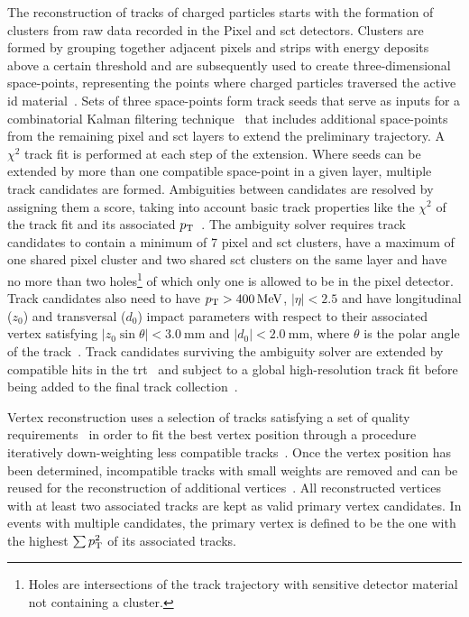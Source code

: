 The reconstruction of tracks of charged particles starts with the formation of clusters from raw data recorded in the Pixel and \gls{sct} detectors. Clusters are formed by grouping together adjacent pixels and strips with energy deposits above a certain threshold and are subsequently used to create three-dimensional space-points, representing the points where charged particles traversed the active \gls{id} material~\cite{PERF-2015-08}. Sets of three space-points form track seeds that serve as inputs for a combinatorial Kalman filtering technique~\cite{Fruhwirth:178627} that includes additional space-points from the remaining pixel and \gls{sct} layers to extend the preliminary trajectory. A $\chi^2$ track fit is performed at each step of the extension. Where seeds can be extended by more than one compatible space-point in a given layer, multiple track candidates are formed. Ambiguities between candidates are resolved by assigning them a score, taking into account basic track properties like the $\chi^2$ of the track fit and its associated $p_{\textrm{T}}$~\cite{PERF-2015-08}. The ambiguity solver requires track candidates to contain a minimum of 7 pixel and \gls{sct} clusters, have a maximum of one shared pixel cluster and two shared \gls{sct} clusters on the same layer and have no more than two holes\footnote{Holes are intersections of the track trajectory with sensitive detector material not containing a cluster.} of which only one is allowed to be in the pixel detector. Track candidates also need to have $\pt > \SI{400}{\MeV}$, $\vert\eta\vert < 2.5$ and have longitudinal ($z_0$) and transversal ($d_0$) impact parameters with respect to their associated vertex satisfying $\vert z_0 \sin\theta \vert < \SI{3.0}{\milli\meter}$ and $\vert d_0 \vert < \SI{2.0}{\milli\meter}$, where $\theta$ is the polar angle of the track~\cite{PERF-2015-08}. Track candidates surviving the ambiguity solver are extended by compatible hits in the \gls{trt}~\cite{Cornelissen:1176900} and subject to a global high-resolution track fit before being added to the final track collection~\cite{PERF-2015-08}.

Vertex reconstruction uses a selection of tracks satisfying a set of quality requirements~\cite{ATL-PHYS-PUB-2015-026} in order to fit the best vertex position through a procedure iteratively down-weighting less compatible tracks~\cite{PERF-2015-01}. Once the vertex position has been determined, incompatible tracks with small weights are removed and can be reused for the reconstruction of additional vertices~\cite{PERF-2015-01}. All reconstructed vertices with at least two associated tracks are kept as valid primary vertex candidates. In events with multiple candidates, the primary vertex is defined to be the one with the highest $\sum p_{\textrm{T}}^2$ of its associated tracks.

